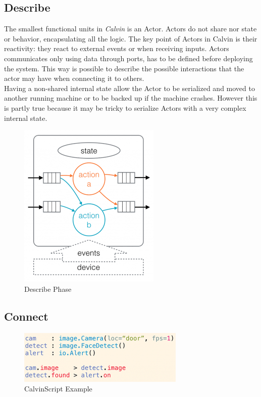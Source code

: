 \subsection{Describe}
  The smallest functional units in \textit{Calvin} is an Actor. Actors do not share
  nor state or behavior, encapsulating all the logic. The key point of Actors in Calvin
  is their reactivity: they react to external events or when receiving inputs. Actors
  communicates only using data through ports, has to be defined before deploying the system.
  This way is possible to describe the possible interactions that the actor may have when
  connecting it to others.\\
  Having a non-shared internal state allow the Actor to be serialized and moved to another
  running machine or to be backed up if the machine crashes. However this is partly true because
  it may be tricky to serialize Actors with a very complex internal state.

  \begin{figure}[h]
  \caption{Describe Phase}
  \centering
  \includegraphics[scale=0.75]{calvin1.png}
  \end{figure}


\subsection{Connect}

    \begin{figure}[h]
    \caption{CalvinScript Example}
    \label{fig:calvinscript}
    \centering
    \includegraphics[scale=0.75]{calvin2.png}
    \end{figure}

